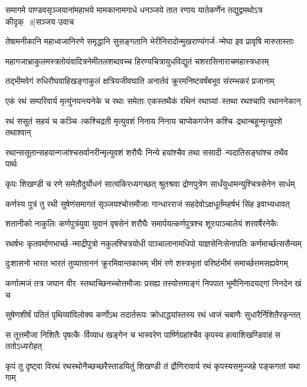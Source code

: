 \threelineshloka
{समागमे पाण्डवसृञ्जयानांमहाभये मामकानामगाधे}
{धनञ्जये तात रणाय यातेकर्णेन तद्युद्वमथोऽत्र कीदृक् ॥]सञ्जय उवाच}
{}


\twolineshloka
{तेषामनीकानि महाध्वजानिरणे समृद्धानि सुसङ्गतानि}
{भेरीनिरादोन्मुखराण्यंगर्ज--न्मेघा इव प्रावृषि मारुतास्ताः}


\twolineshloka
{महागजाभ्राकुलमस्त्रतोयंवादित्रनेमीतलशब्दवच्च}
{हिरण्यचित्रायुधविद्युतं चशरासिनाराचमहास्त्रधारम्}


\twolineshloka
{तद्भीमवेगं रुधिरौघवाहिखङ्गाकुलं क्षत्रियजीवघाति}
{अनार्तवं क्रूरमनिष्टवर्षंबभूव संरम्भकरं प्रजानाम्}


\twolineshloka
{एकं रथं सम्परिवार्य मृत्युंनयन्त्यनेके च रथाः समेताः}
{एकस्तथैकं रथिनं रथाग्र्यां--स्तथा रथश्चापि रथाननेकान्}


\twolineshloka
{रथं ससूतं सहयं च कञ्चि--त्कश्चिद्रती मृत्युवशं निनाय}
{निनाय चाप्येकगजेन कश्चि--द्रथान्बहून्मृत्युवशे तथाश्वान्}


\twolineshloka
{रथान्ससूतान्सहयान्गजांश्चसर्वानरीन्मृत्युवशं शरौघैः}
{निन्ये हयांश्चैव तथा ससादी--न्पदातिसङ्घांश्च तथैव पार्थः}


\twolineshloka
{कृपः शिखण्डी च रणे समेतौदुर्योधनं सात्यकिरध्यगच्छत्}
{श्रुतश्रवा द्रोणपुत्रेण सार्धंयुधामन्युश्चित्रसेनेन सार्धम्}


\twolineshloka
{कर्णस्य पुत्रं तु रथी सुषेणंसमागतं सृञ्जयश्चोत्तमौजाः}
{गान्धारराजं सहदेवोऽक्षधूर्तंमहर्षभं सिंह इवाभ्यधावत्}


\twolineshloka
{शतानीको नाकुलिः कर्णपुत्रंयुवा युवानं वृषसेनं शरौघैः}
{समार्पयत्कर्णपुत्रश्च शूरःपाञ्चालेयं शरवर्षैरनेकैः}


\twolineshloka
{रथर्षभः कृतवर्माणभार्च्छ--न्माद्रीपुत्रो नकुलश्चित्रयोधी}
{पाञ्चालानामधिपो याज्ञसेनिःसेनापतिः कर्णमार्च्छत्ससैन्यम्}


\twolineshloka
{दुःशासनो भारत भारतं तुव्यात्ताननं क्रूरमिवान्तकाभम्}
{भीमं रणे शस्त्रभृतां वरिष्ठंभीमं समार्च्छत्तमसह्यवेगम्}


\twolineshloka
{कर्णात्मजं तत्र जघान वीर--स्तथाच्छिनच्चोत्तमौजाः प्रसह्य}
{तस्योत्तमाङ्गं निपपात भूमौनिनादयद्गां निनदेन खं च}


\twolineshloka
{सुषेणशीर्षं पतितं पृथिव्यांविलोक्य कर्णोऽथ तदार्तरूपः}
{क्रोधाद्धयांस्तस्य रथं ध्वजं चबाणैः सुधारैर्निशितैरकृन्तत्}


\twolineshloka
{स तूत्तमौजा निशितैः पृषत्कै--र्विव्याध खङ्गेन च भास्वरेण}
{पार्ष्णिग्रहांश्चैव कृपस्य हत्वाशिखण्डिवाहं स ततोऽध्यरोहत्}


\twolineshloka
{कृपं तु दृष्ट्वा विरथं रथस्थोनैच्छच्छरैस्ताडयितुं शिखण्डी}
{तं द्रौणिरावार्य रथं कृपस्यसमुज्जहे पङ्कगतां यथा गाम्}



